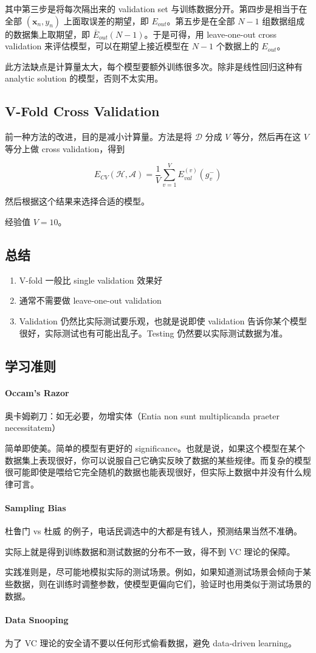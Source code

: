 \documentclass[a4paper]{article}
\begin{document}
其中第三步是将每次隔出来的 validation set 与训练数据分开。第四步是相当于在全部 $(\mathbf{x}_n, y_n)$ 上面取误差的期望，即 $E_{out}$。第五步是在全部 $N - 1$ 组数据组成的数据集上取期望，即 $\bar{E}_{out}(N-1)$。于是可得，用 leave-one-out cross validation 来评估模型，可以在期望上接近模型在 $N - 1$ 个数据上的 $E_{out}$。

此方法缺点是计算量太大，每个模型要额外训练很多次。除非是线性回归这种有 analytic solution 的模型，否则不太实用。

\subsection{V-Fold Cross Validation}
前一种方法的改进，目的是减小计算量。方法是将 $\mathcal{D}$ 分成 $V$ 等分，然后再在这 $V$ 等分上做 cross validation，得到

$$E_{CV}(\mathcal{H, A}) = \frac{1}{V}\sum_{v=1}^{V}E_{val}^{(v)}(g_{v}^{-})$$

然后根据这个结果来选择合适的模型。

经验值 $V = 10$。

\subsection{总结}
\begin{enumerate}
  \item V-fold 一般比 single validation 效果好
  \item 通常不需要做 leave-one-out validation
  \item Validation 仍然比实际测试要乐观，也就是说即使 validation 告诉你某个模型很好，实际测试也有可能出乱子。Testing 仍然要以实际测试数据为准。
\end{enumerate}

\subsection{学习准则}
\paragraph{Occam's Razor}
奥卡姆剃刀：如无必要，勿增实体（Entia non sunt multiplicanda praeter necessitatem）

简单即使美。简单的模型有更好的 significance。也就是说，如果这个模型在某个数据集上表现很好，你可以说服自己它确实反映了数据的某些规律。而复杂的模型很可能即使是喂给它完全随机的数据也能表现很好，但实际上数据中并没有什么规律可言。

\paragraph{Sampling Bias}
杜鲁门 vs 杜威 的例子，电话民调选中的大都是有钱人，预测结果当然不准确。

实际上就是得到训练数据和测试数据的分布不一致，得不到 VC 理论的保障。

实践准则是，尽可能地模拟实际的测试场景。例如，如果知道测试场景会倾向于某些数据，则在训练时调整参数，使模型更偏向它们，验证时也用类似于测试场景的数据。

\paragraph{Data Snooping}

为了 VC 理论的安全请不要以任何形式偷看数据，避免 data-driven learning。
\end{document}
